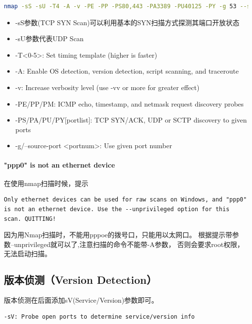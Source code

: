 \documentclass{book}
\begin{document}
\begin{lstlisting}[language=Bash]
nmap -sS -sU -T4 -A -v -PE -PP -PS80,443 -PA3389 -PU40125 -PY -g 53 --script "default or (discovery and safe)" 12.26.32.14 
\end{lstlisting}

\begin{itemize}
	\item{-sS参数(TCP SYN Scan)可以利用基本的SYN扫描方式探测其端口开放状态}
	\item{-sU参数代表UDP Scan}
	\item{-T<0-5>: Set timing template (higher is faster)}
	\item{-A: Enable OS detection, version detection, script scanning, and traceroute}
	\item{-v: Increase verbosity level (use -vv or more for greater effect)}
	\item{-PE/PP/PM: ICMP echo, timestamp, and netmask request discovery probes}
	\item{-PS/PA/PU/PY[portlist]: TCP SYN/ACK, UDP or SCTP discovery to given ports}
	\item{-g/--source-port <portnum>: Use given port number}
\end{itemize}


\paragraph{"ppp0" is not an ethernet device}在使用nmap扫描时候，提示 

\begin{lstlisting}
Only ethernet devices can be used for raw scans on Windows, and "ppp0" is not an ethernet device. Use the --unprivileged option for this scan. QUITTING!
\end{lstlisting}

因为用Nmap扫描时，不能用pppoe的拨号口，只能用以太网口。
根据提示带参数--unprivileged就可以了,注意扫描的命令不能带-A参数，
否则会要求root权限，无法启动扫描。 


\subsection{版本侦测（Version Detection）}

版本侦测在后面添加sV(Service/Version)参数即可。

\begin{lstlisting}[language=Bash]
 -sV: Probe open ports to determine service/version info
\end{lstlisting}
\end{document}
